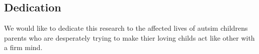 \begin{center}
    \section*{Dedication}
\end{center}
We would like to dedicate this research to the affected lives of autsim childrens parents who are desperately trying to make thier loving childs act like other with a firm mind.
